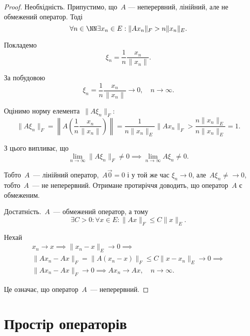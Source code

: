 \begin{proof}
Необхідність. Припустимо, що~$A$ ---
неперервний, лінійний, але не обмежений оператор. Тоді
\begin{equation*}
    \forall n \in \NN \exists x_n \in E: \|Ax_n\|_F > n \|x_n\|_E.
\end{equation*}

Покладемо
\begin{equation*}
    \xi_n = \frac{1}{n} \frac{x_n}{\|x_n\|}.
\end{equation*}

За побудовою
\begin{equation*}
    \xi_n = \frac{1}{n} \frac{x_n}{\|x_n\|} \to 0, \quad n \to \infty.
\end{equation*}

Оцінимо норму елемента~$\|A \xi_n\|_F$:
\begin{equation*}
    \|A \xi_n\|_F = \left\| A \left( \frac{1}{n} \frac{x_n}{\|x_n\|} \right) \right\| =
    \frac{1}{n \|x_n\|_E} \|A x_n\|_F > \frac{n \|x_n\|_E}{n \|x_n\|_E} = 1.
\end{equation*}

З цього випливає, що
\begin{equation*}
    \lim_{n \to \infty} \|A \xi_n\|_F \ne 0 \implies
    \lim_{n \to \infty} A \xi_n \ne 0.
\end{equation*}

Тобто~$A$~--- лінійний оператор,~$A \vec 0 = 0$ і у той же час
$\xi_n \to 0$, але~$A \xi_n \ne\to 0$, тобто~$A$~--- не неперервний.
Отримане протиріччя доводить, що оператор~$A$ є обмеженим.

Достатність.~$A$~--- обмежений оператор, а тому
\begin{equation*}
    \exists C > 0: \forall x \in E: \|A x\|_F \le C \|x\|_E.
\end{equation*}

Нехай
\begin{multline*}
    x_n \to x \implies \|x_n - x\|_E \to 0 \implies \\
    \|Ax_n - Ax\|_F = \|A (x_n - x)\|_F \le C \|x - x_n\|_E \to 0 \implies \\
    \|A x_n - A x\|_F \to 0 \implies A x_n \to A x, \quad n \to \infty.
\end{multline*}

Це означає, що оператор~$A$~--- неперервний. 
\end{proof}

\section{Простір операторів}

